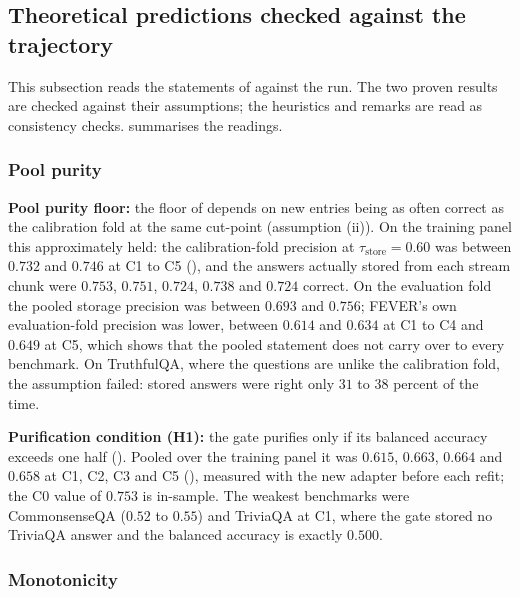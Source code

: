 \subsection{Theoretical predictions checked against the trajectory}
\label{sec:theory-checks}

This subsection reads the statements of  against the run. The two proven results are checked against their assumptions; the heuristics and remarks are read as consistency checks.  summarises the readings.



\subsubsection{Pool purity}
\label{sec:check-purity}

\textbf{Pool purity floor:} the floor of  depends on new entries being as often correct as the calibration fold at the same cut-point (assumption (ii)). On the training panel this approximately held: the calibration-fold precision at $\tau_{\text{store}} = 0.60$ was between $0.732$ and $0.746$ at C1 to C5 (), and the answers actually stored from each stream chunk were $0.753$, $0.751$, $0.724$, $0.738$ and $0.724$ correct. On the evaluation fold the pooled storage precision was between $0.693$ and $0.756$; FEVER's own evaluation-fold precision was lower, between $0.614$ and $0.634$ at C1 to C4 and $0.649$ at C5, which shows that the pooled statement does not carry over to every benchmark. On TruthfulQA, where the questions are unlike the calibration fold, the assumption failed: stored answers were right only $31$ to $38$ percent of the time.



\textbf{Purification condition (H1):} the gate purifies only if its balanced accuracy exceeds one half (). Pooled over the training panel it was $0.615$, $0.663$, $0.664$ and $0.658$ at C1, C2, C3 and C5 (), measured with the new adapter before each refit; the C0 value of $0.753$ is in-sample. The weakest benchmarks were CommonsenseQA ($0.52$ to $0.55$) and TriviaQA at C1, where the gate stored no TriviaQA answer and the balanced accuracy is exactly $0.500$.

\subsubsection{Monotonicity}
\label{sec:check-monotonicity}

